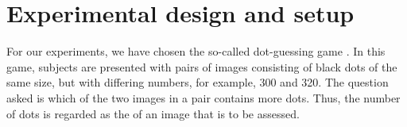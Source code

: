 \documentclass[a4paper,conference]{IEEEtran}
\begin{document}



\section{Experimental design and setup}
\begin{comment}
In our experiment, we used dot images with a relatively large number of dots to prevent participants from counting the dots. These images are suitable for our experiment because:
\begin{itemize}
\item The correct ranking order of the dot images is known, allowing us to objectively assess the subjects' responses.
 
 \item  The task of comparing two dot images to determine which one has more dots is simple to understand, reducing the chance of unreliable responses due to misunderstandings of the subjective task.

 \item The number of dots between paired images varies, with some pairs being harder to compare than others. For instance, the number of dots can differ by only two in some pairs, while in others it can vary by 40. This introduces uncertainty in the assessment of some paired images, making it interesting to study the impact of offering a \say{not sure} option in addition to selecting the left or right image.
\end{itemize}
\end{comment}

For our experiments, we have chosen the so-called dot-guessing game \cite{horton2010dot}. In this game, subjects are presented with pairs of images consisting of black dots of the same size, but with differing numbers, for example, 300 and 320. The question asked is which of the two images in a pair contains more dots. Thus, the number of dots is regarded as the  of an image that is to be assessed. %
\end{document}
